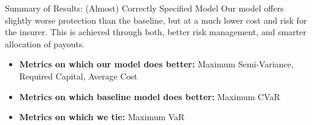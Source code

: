 \documentclass{beamer}
\begin{document}
\begin{frame}{Summary of Results: (Almost) Correctly Specified Model}
Our model offers slightly worse protection than the baseline, but at a much lower cost and risk for the insurer. This is achieved through both, better risk management, and smarter allocation of payouts. 
\begin{itemize}
    \item \textbf{Metrics on which our model does better:} Maximum Semi-Variance, Required Capital, Average Cost
    \item \textbf{Metrics on which baseline model does better:} Maximum CVaR 
    \item \textbf{Metrics on which we tie:} Maximum VaR
\end{itemize}
    
    
\end{frame}
\end{document}
